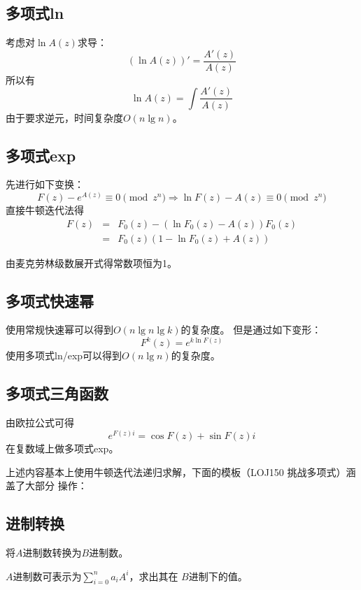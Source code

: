 \subsection{多项式ln}
考虑对$\ln A(z)$求导：
\begin{displaymath}
    (\ln A(z))'=\frac{A'(z)}{A(z)}
\end{displaymath}
所以有
\begin{displaymath}
    \ln A(z)=\int \frac{A'(z)}{A(z)}
\end{displaymath}
由于要求逆元，时间复杂度$O(n \lg n)$。
\subsection{多项式exp}
先进行如下变换：
\begin{displaymath}
    F(z)-e^{A(z)}\equiv 0 \pmod{z^n}
    \Rightarrow \ln F(z)-A(z)\equiv 0 \pmod{z^n}
\end{displaymath}
直接牛顿迭代法得
\begin{eqnarray*}
    F(z)&=&F_0(z)-(\ln F_0(z)-A(z))F_0(z)\\
    &=&F_0(z)(1-\ln F_0(z)+A(z))
\end{eqnarray*}

由麦克劳林级数展开式得常数项恒为1。
\subsection{多项式快速幂}
使用常规快速幂可以得到$O(n\lg n\lg k)$的复杂度。
但是通过如下变形：
\begin{displaymath}
    F^k(z)=e^{k \ln F(z)}
\end{displaymath}
使用多项式ln/exp可以得到$O(n\lg n)$的复杂度。
\subsection{多项式三角函数}
由欧拉公式可得
\begin{displaymath}
    e^{F(z)i}=\cos F(z)+\sin F(z) i
\end{displaymath}
在复数域上做多项式exp。

上述内容基本上使用牛顿迭代法递归求解，下面的模板（LOJ150 挑战多项式）涵盖了大部分
操作：


\subsection{进制转换}
将$A$进制数转换为$B$进制数。

$A$进制数可表示为$\displaystyle \sum_{i=0}^n{a_iA^i}$，求出其在
$B$进制下的值。

